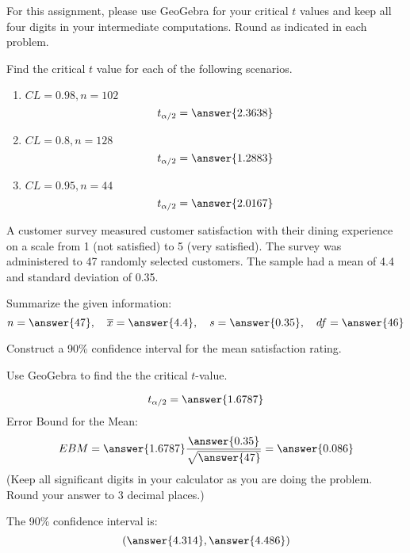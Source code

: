 \documentclass{ximera}
\begin{document}
For this assignment, please use GeoGebra for your critical $t$ values and keep all four digits in your intermediate computations.  Round as indicated in each problem.
 
 \begin{problem}\label{prob:140hom7prob3}
 Find the critical $t$ value for each of the following scenarios.
 \begin{center}  
\end{center}
\begin{enumerate}
    \item $CL=0.98, n=102$
    $$t_{\alpha/2}=\answer{2.3638}$$
    \item $CL=0.8, n=128$
    $$t_{\alpha/2}=\answer{1.2883}$$
    \item $CL=0.95, n=44$
    $$t_{\alpha/2}=\answer{2.0167}$$
\end{enumerate}
 \end{problem}
 
 \begin{problem}\label{prob:140hom7prob1}
 A customer survey measured customer satisfaction with their dining experience on a scale from 1 (not satisfied) to 5 (very satisfied).  The survey was administered to 47 randomly selected customers.  The sample had a mean of 4.4 and standard deviation of 0.35.  
 
 Summarize the given information:
 $$n=\answer{47},\quad\overline{x}=\answer{4.4},\quad s=\answer{0.35},\quad df=\answer{46}$$
 
 Construct a 90\% confidence interval for the mean satisfaction rating.
 
  Use GeoGebra to find the the critical $t$-value. 
 \begin{center}  
\end{center}
$$t_{\alpha/2}=\answer{1.6787}$$
Error Bound for the Mean:
$$EBM=\answer{1.6787}\frac{\answer{0.35}}{\sqrt{\answer{47}}}=\answer{0.086}$$
(Keep all significant digits in your calculator as you are doing the problem.  Round your answer to 3 decimal places.)

The 90\% confidence interval is:
$$(\answer{4.314},\answer{4.486})$$
 
 \end{problem}
 
\end{document}
